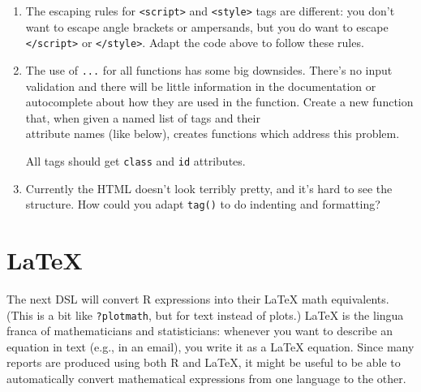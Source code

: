 \begin{enumerate}
\def\labelenumi{\arabic{enumi}.}
\item
  The escaping rules for \texttt{\textless{}script\textgreater{}} and
  \texttt{\textless{}style\textgreater{}} tags are different: you don't
  want to escape angle brackets or ampersands, but you do want to escape
  \texttt{\textless{}/script\textgreater{}} or
  \texttt{\textless{}/style\textgreater{}}. Adapt the code above to
  follow these rules.
\item
  The use of \texttt{...} for all functions has some big downsides.
  There's no input validation and there will be little information in
  the documentation or autocomplete about how they are used in the
  function. Create a new function that, when given a named list of tags
  and their\\attribute names (like below), creates functions which
  address this problem.

\begin{Shaded}
\begin{Highlighting}[]
\NormalTok{(}
   \NormalTok{(}\NormalTok{),}
   \NormalTok{(}\NormalTok{, }\NormalTok{, }\NormalTok{)}
\NormalTok{)}
\end{Highlighting}
\end{Shaded}

  All tags should get \texttt{class} and \texttt{id} attributes.
\item
  Currently the HTML doesn't look terribly pretty, and it's hard to see
  the structure. How could you adapt \texttt{tag()} to do indenting and
  formatting?
\end{enumerate}

\section{LaTeX}\label{latex}

The next DSL will convert R expressions into their LaTeX math
equivalents. (This is a bit like \texttt{?plotmath}, but for text
instead of plots.) LaTeX is the lingua franca of mathematicians and
statisticians: whenever you want to describe an equation in text (e.g.,
in an email), you write it as a LaTeX equation. Since many reports are
produced using both R and LaTeX, it might be useful to be able to
automatically convert mathematical expressions from one language to the
other. 

